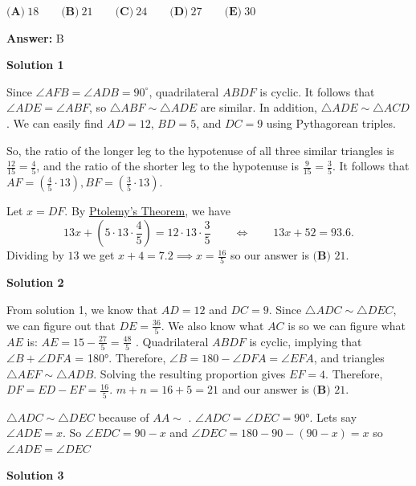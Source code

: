 \begin{enumerate}
 $\textbf{(A)}\ 18\qquad\textbf{(B)}\ 21\qquad\textbf{(C)}\ 24\qquad\textbf{(D)}\ 27\qquad\textbf{(E)}\ 30$

 \textbf{Answer: }B



\textbf{Solution 1}

Since $\angle{AFB}=\angle{ADB}=90^{\circ}$, quadrilateral $ABDF$ is cyclic. It follows that $\angle{ADE}=\angle{ABF}$, so $\triangle ABF \sim \triangle ADE$ are similar. In addition, $\triangle ADE \sim \triangle ACD$. We can easily find $AD=12$, $BD = 5$, and $DC=9$ using Pythagorean triples. 

 So, the ratio of the longer leg to the hypotenuse of all three similar triangles is $\frac{12}{15} = \frac{4}{5}$, and the ratio of the shorter leg to the hypotenuse is $\frac{9}{15} = \frac{3}{5}$. It follows that $AF=(\frac{4}{5}\cdot 13), BF=(\frac{3}{5}\cdot 13)$. 

 Let $x=DF$. By \href{https://artofproblemsolving.com/wiki/index.php?title=Ptolemy\%27s\_Theorem}{Ptolemy's Theorem}, we have 
 \[13x+\left(5\cdot 13\cdot \frac{4}{5}\right)= 12\cdot 13\cdot \frac{3}{5} \qquad \Leftrightarrow \qquad 13x+52=93.6.\] Dividing by $13$ we get $x+4=7.2\implies x=\frac{16}{5}$ so our answer is $\boxed{\textbf{(B) }21}$.

 



\textbf{Solution 2}

From solution 1, we know that $AD = 12$ and $DC = 9$. Since $\triangle ADC \sim \triangle DEC$, we can figure out that $DE = \frac{36}{5}$. We also know what $AC$ is so we can figure what $AE$ is: $AE = 15 - \frac{27}{5} = \frac{48}{5}$ . Quadrilateral $ABDF$ is cyclic, implying that $\angle{B} + \angle{DFA}$ = 180°. Therefore, $\angle{B} = 180 - \angle{DFA} = \angle{EFA}$, and triangles $\triangle AEF \sim \triangle ADB$. Solving the resulting proportion gives $EF = 4$. Therefore, $DF = ED - EF = \frac{16}{5}$. $m + n = 16 + 5 = 21$ and our answer is $\boxed{\textbf{(B) } 21}$. 

 $\triangle ADC \sim \triangle DEC$ because of $AA \sim$ . $\angle{ADC} = \angle{DEC} = 90°$. Lets say $\angle{ADE} = x$. So  $\angle{EDC} = 90 - x$ and $\angle{DEC} = 180 - 90 - (90 - x) = x$ so $\angle{ADE} = \angle{DEC}$




\textbf{Solution 3}


\end{enumerate}
